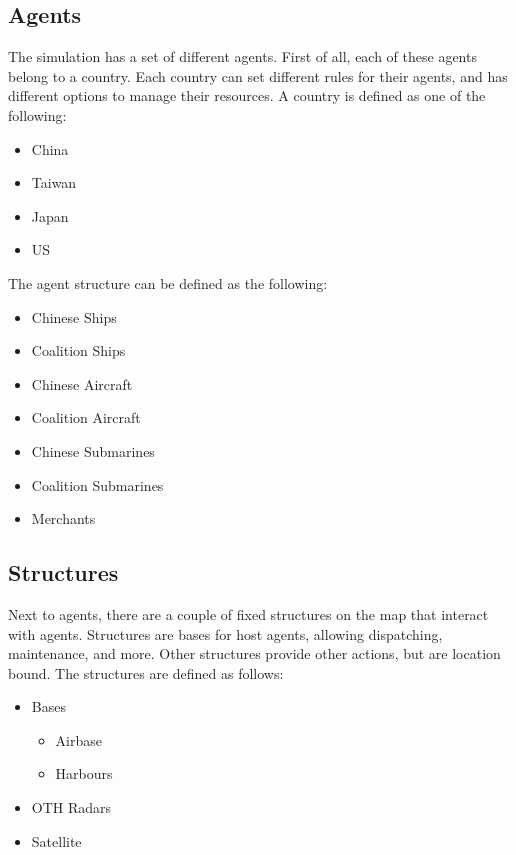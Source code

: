 \documentclass{article}
\begin{document}
\subsection{Agents}

The simulation has a set of different agents. First of all, each of these agents belong to a country. Each country can set different rules for their agents, and has different options to manage their resources. A country is defined as one of the following:

\begin{itemize}
    \item China
    \item Taiwan
    \item Japan
    \item US
\end{itemize}

\noindent The agent structure can be defined as the following:

\begin{itemize}
    \item Chinese Ships
    \item Coalition Ships
    \item Chinese Aircraft
    \item Coalition Aircraft
    \item Chinese Submarines
    \item Coalition Submarines
    \item Merchants
\end{itemize}

\subsection{Structures}

\noindent Next to agents, there are a couple of fixed structures on the map that interact with agents. Structures are bases for host agents, allowing dispatching, maintenance, and more. Other structures provide other actions, but are location bound. The structures are defined as follows:

\begin{itemize}
    \item Bases
    \begin{itemize}
        \item Airbase
        \item Harbours
    \end{itemize}
    \item OTH Radars
    \item Satellite
\end{itemize}
\end{document}
